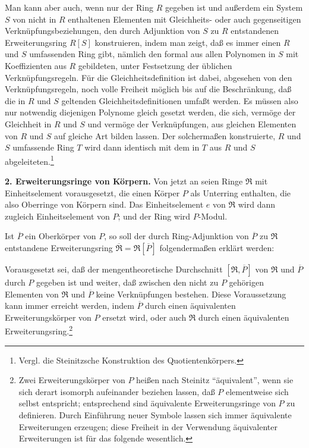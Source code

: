 \documentclass[11pt]{article}
\begin{document}
Man kann aber auch, wenn nur der Ring $R$ gegeben ist und außerdem ein System $S$ von nicht in $R$ enthaltenen Elementen mit Gleichheits- oder auch gegenseitigen Verknüpfungsbeziehungen, den durch Adjunktion von $S$ zu $R$ entstandenen Erweiterungsring $R[S]$ konstruieren, indem man zeigt, daß es immer einen $R$ und $S$ umfassenden Ring gibt, nämlich den formal aus allen Polynomen in $S$ mit Koeffizienten aus $R$ gebildeten, unter Festsetzung der üblichen Verknüpfungsregeln. Für die Gleichheitsdefinition ist dabei, abgesehen von den Verknüpfungsregeln, noch volle Freiheit möglich bis auf die Beschränkung, daß die in $R$ und $S$ geltenden Gleichheitsdefinitionen umfaßt werden. Es müssen also nur notwendig diejenigen Polynome gleich gesetzt werden, die sich, vermöge der Gleichheit in $R$ und $S$ und vermöge der Verknüpfungen, aus gleichen Elementen von $R$ und $S$ auf gleiche Art bilden lassen. Der solchermaßen konstruierte, $R$ und $S$ umfassende Ring $T$ wird dann identisch mit dem in $T$ aus $R$ und $S$ abgeleiteten.\footnote{Vergl. die Steinitzsche Konstruktion des Quotientenkörpers.}

\textbf{2. Erweiterungsringe von Körpern.} Von jetzt an seien Ringe $\mathfrak R$ mit Einheitselement vorausgesetzt, die einen Körper $P$ als Unterring enthalten, die also Oberringe von Körpern sind. Das Einheitselement $e$ von $\mathfrak R$ wird dann zugleich Einheitselement von $P$; und der Ring wird $P$-Modul.

Ist $\overline P$ ein Oberkörper von $P$, so soll der durch Ring-Adjunktion von $\overline P$ zu $\mathfrak R$ entstandene Erweiterungsring $\overline{\mathfrak R}=\mathfrak R[\overline P]$ folgendermaßen erklärt werden:

Vorausgesetzt sei, daß der mengentheoretische Durchschnitt $[\mathfrak R,\overline P]$ von $\mathfrak R$ und $\overline P$ durch $P$ gegeben ist und weiter, daß zwischen den nicht zu $P$ gehörigen Elementen von $\mathfrak R$ und $\overline P$ keine Verknüpfungen bestehen. Diese Voraussetzung kann immer erreicht werden, indem $\overline P$ durch einen äquivalenten Erweiterungskörper von $P$ ersetzt wird, oder auch $\mathfrak R$ durch einen äquivalenten Erweiterungsring.\footnote{Zwei Erweiterungskörper von $P$ heißen nach Steinitz ``äquivalent'', wenn sie sich derart isomorph aufeinander beziehen lassen, daß $P$ elementweise sich selbst entspricht; entsprechend sind äquivalente Erweiterungsringe von $P$ zu definieren. Durch Einführung neuer Symbole lassen sich immer äquivalente Erweiterungen erzeugen; diese Freiheit in der Verwendung äquivalenter Erweiterungen ist für das folgende wesentlich.}
\end{document}
